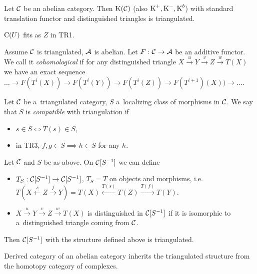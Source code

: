 



	
	\begin{theorem}
		Let $\mathcal{C}$ be an abelian category. Then $\operatorname{K}(\mathcal{C})$
		(also $\operatorname{K}^+, \operatorname{K}^-, \operatorname{K}^b$) with standard translation functor
		and distinguished triangles is triangulated.
	\end{theorem}
	
	\begin{remark}
		$\operatorname{C}(U)$ fits as $Z$ in TR1.
	\end{remark}
	
	\begin{definition}
		Assume $\mathcal{C}$ is triangulated, $\mathcal{A}$ is abelian.
		Let $F :\mathcal{C} \to \mathcal{A}$ be an additive functor. We call it 
		{\em cohomological}
		if for any distinguished triangle
		$X \xrightarrow u Y \xrightarrow v Z \xrightarrow w T(X)$
		we have an exact sequence
		$\ldots \to F(T^i(X)) \to F(T^i(Y)) \to F(T^i(Z)) 
		\to F(T^{i+1})(X)) \to \ldots$.
	\end{definition}
	
	\begin{definition}
		Let $\mathcal{C}$ be a~triangulated category,
		$S$ a~localizing class of morphisms in $\mathcal{C}$.
		We say that $S$ is {\em compatible} with triangulation if
		\begin{itemize}
			\item $s \in S \iff T(s) \in S$,
			\item in TR3, $f, g \in S \implies h \in S$ for any $h$.
		\end{itemize}
	\end{definition}
	
	\begin{theorem}
		Let $\mathcal{C}$ and $S$ be as above. On $\mathcal{C}[S^{-1}]$
		we can define
		\begin{itemize}
			\item $T_S: \mathcal{C}[S^{-1}] \to \mathcal{C}[S^{-1}]$, $T_S = T$
			on objects and morphisms,
			i.e. $T(X \xleftarrow{s} Z \xrightarrow{f} Y)
			=T(X) \xleftarrow{T(s)} T(Z) \xrightarrow{T(f)} T(Y)$.
			\item 
			$X \xrightarrow u Y \xrightarrow v Z \xrightarrow w T(X)$
			is distinguished in $\mathcal{C}[S^{-1}]$ if it is isomorphic to
			a~distinguished triangle coming from $\mathcal{C}$.
		\end{itemize}
		Then $\mathcal{C}[S^{-1}]$ with the structure defined above is triangulated.
	\end{theorem}
	
	\begin{corollary}
		Derived category of an abelian category inherits
		the triangulated structure from the homotopy
		category of complexes.
	\end{corollary}







 
 

